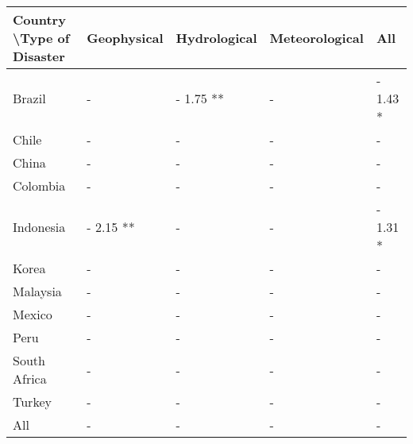 \begin{tabular}{lllll}
\hline
Country \textbackslash Type of Disaster & Geophysical & Hydrological & Meteorological & All \\ \hline
Brazil & - & - 1.75 ** & - & - 1.43 * \\
Chile & - & - & - & - \\
China & - & - & - & - \\
Colombia & - & - & - & - \\
Indonesia & - 2.15 ** & - & - & - 1.31 * \\
Korea & - & - & - & - \\
Malaysia & - & - & - & - \\
Mexico & - & - & - & - \\
Peru & - & - & - & - \\
South Africa & - & - & - & - \\
Turkey & - & - & - & - \\
All & - & - & - & - \\ \hline
\end{tabular}
